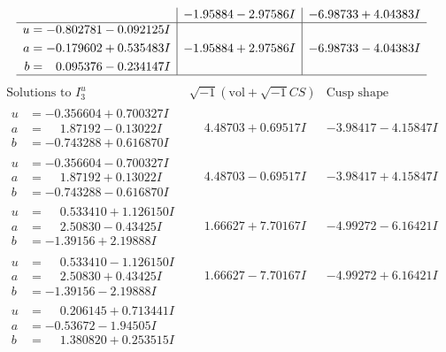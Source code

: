 \documentclass[1p]{elsarticle_modified}
\theoremstyle{definition}
\newcommand{\I}{\sqrt{-1}}
\begin{document}
$$\begin{array}{c|c|c}
 & -1.95884 - 2.97586 I & -6.98733 + 4.04383 I \\ \hline\begin{aligned}
u &= -0.802781 - 0.092125 I \\
a &= -0.179602 + 0.535483 I \\
b &= \phantom{-}0.095376 - 0.234147 I\end{aligned}
 & -1.95884 + 2.97586 I & -6.98733 - 4.04383 I\\
 \hline 
 \end{array}$$\newpage$$\begin{array}{c|c|c}  
\text{Solutions to }I^u_{3}& \I (\text{vol} + \sqrt{-1}CS) & \text{Cusp shape}\\
 \hline 
\begin{aligned}
u &= -0.356604 + 0.700327 I \\
a &= \phantom{-}1.87192 - 0.13022 I \\
b &= -0.743288 + 0.616870 I\end{aligned}
 & \phantom{-}4.48703 + 0.69517 I & -3.98417 - 4.15847 I \\ \hline\begin{aligned}
u &= -0.356604 - 0.700327 I \\
a &= \phantom{-}1.87192 + 0.13022 I \\
b &= -0.743288 - 0.616870 I\end{aligned}
 & \phantom{-}4.48703 - 0.69517 I & -3.98417 + 4.15847 I \\ \hline\begin{aligned}
u &= \phantom{-}0.533410 + 1.126150 I \\
a &= \phantom{-}2.50830 - 0.43425 I \\
b &= -1.39156 + 2.19888 I\end{aligned}
 & \phantom{-}1.66627 + 7.70167 I & -4.99272 - 6.16421 I \\ \hline\begin{aligned}
u &= \phantom{-}0.533410 - 1.126150 I \\
a &= \phantom{-}2.50830 + 0.43425 I \\
b &= -1.39156 - 2.19888 I\end{aligned}
 & \phantom{-}1.66627 - 7.70167 I & -4.99272 + 6.16421 I \\ \hline\begin{aligned}
u &= \phantom{-}0.206145 + 0.713441 I \\
a &= -0.53672 - 1.94505 I \\
b &= \phantom{-}1.380820 + 0.253515 I\end{aligned}

\end{array}$$
\end{document}
